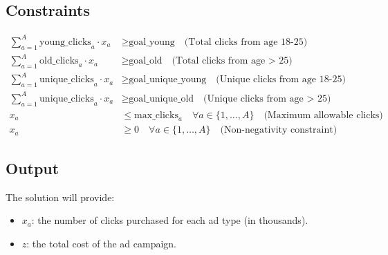 \documentclass{article}
\begin{document}
\subsection*{Constraints}
\begin{align*}
\sum_{a=1}^{A} \text{young\_clicks}_a \cdot x_a & \geq \text{goal\_young} \quad \text{(Total clicks from age 18-25)} \\
\sum_{a=1}^{A} \text{old\_clicks}_a \cdot x_a & \geq \text{goal\_old} \quad \text{(Total clicks from age > 25)} \\
\sum_{a=1}^{A} \text{unique\_clicks}_a \cdot x_a & \geq \text{goal\_unique\_young} \quad \text{(Unique clicks from age 18-25)} \\
\sum_{a=1}^{A} \text{unique\_clicks}_a \cdot x_a & \geq \text{goal\_unique\_old} \quad \text{(Unique clicks from age > 25)} \\
x_a & \leq \text{max\_clicks}_a \quad \forall a \in \{1, \ldots, A\} \quad \text{(Maximum allowable clicks)} \\
x_a & \geq 0 \quad \forall a \in \{1, \ldots, A\} \quad \text{(Non-negativity constraint)}
\end{align*}

\subsection*{Output}
The solution will provide:
\begin{itemize}
    \item \( x_a \): the number of clicks purchased for each ad type (in thousands).
    \item \( z \): the total cost of the ad campaign.
\end{itemize}
\end{document}
